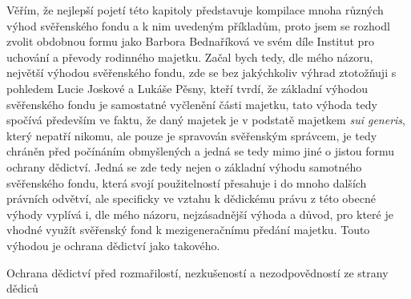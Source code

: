 \documentclass{article}
\begin{document}
 Věřím, že nejlepší pojetí této kapitoly představuje kompilace mnoha různých výhod svěřenského fondu a k nim uvedeným příkladům, proto jsem se rozhodl zvolit obdobnou formu jako Barbora Bednaříková ve svém díle Institut pro uchování a převody rodinného majetku. Začal bych tedy, dle mého názoru, největší výhodou svěřenského fondu, zde se bez jakýchkoliv výhrad ztotožňuji s pohledem Lucie Joskové a Lukáše Pěsny, kteří tvrdí, že základní výhodou svěřenského fondu je samostatné vyčlenění části majetku, tato výhoda tedy spočívá především ve faktu, že daný majetek je v podstatě majetkem \textit{sui generis}, který nepatří nikomu, ale pouze je spravován svěřenským správcem, je tedy chráněn před počínáním obmyšlených a jedná se tedy mimo jiné o jistou formu ochrany dědictví. Jedná se zde tedy nejen o základní výhodu samotného svěřenského fondu, která svojí použitelností přesahuje i do mnoho dalších právních odvětví, ale specificky ve vztahu k dědickému právu z této obecné výhody vyplívá i, dle mého názoru, nejzásadnější výhoda a důvod, pro které je vhodné využít svěřenský fond k mezigeneračnímu předání majetku. Touto výhodou je ochrana dědictví jako takového.\\
 
 
 
 
 
 
 \begin{enumerate}
 {\Large\item Ochrana dědictví před rozmařilostí, nezkušeností a nezodpovědností ze strany dědiců}
 \end{enumerate}
 
\end{document}
